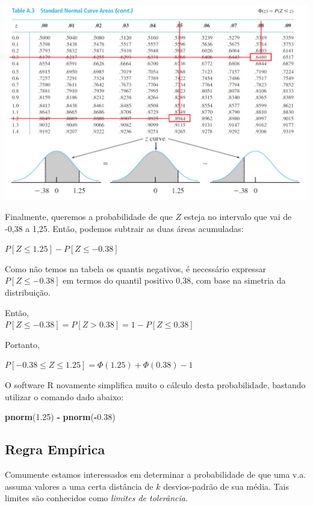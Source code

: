 \documentclass[
]{book}
\newenvironment{Shaded}{\begin{snugshade}}{\end{snugshade}}
\newcommand{\FloatTok}[1]{\textcolor[rgb]{0.00,0.00,0.81}{#1}}
\newcommand{\KeywordTok}[1]{\textcolor[rgb]{0.13,0.29,0.53}{\textbf{#1}}}
\newcommand{\NormalTok}[1]{#1}
\newcommand{\OperatorTok}[1]{\textcolor[rgb]{0.81,0.36,0.00}{\textbf{#1}}}
\newcommand{\StringTok}[1]{\textcolor[rgb]{0.31,0.60,0.02}{#1}}
\theoremstyle{definition}
\theoremstyle{definition}
\theoremstyle{definition}
\theoremstyle{remark}
\begin{document}
\includegraphics[width=1\linewidth]{img/distr-normal-d}

Finalmente, queremos a probabilidade de que \(Z\) esteja no intervalo que vai de -0,38 a 1,25. Então, podemos subtrair as duas áreas acumuladas:

\(P[Z ≤ 1.25] - P[Z ≤ -0.38]\)

Como não temos na tabela os quantis negativos, é necessário expressar \(P[Z ≤ -0.38]\) em termos do quantil positivo 0,38, com base na simetria da distribuição.

Então,\\
\(P[Z ≤ -0.38] = P[Z > 0.38] = 1 - P[Z ≤ 0.38]\)

Portanto,

\(P[-0.38 ≤ Z ≤ 1.25] = \Phi(1.25) + \Phi(0.38) - 1\)

O software R novamente simplifica muito o cálculo desta probabilidade, bastando utilizar o comando dado abaixo:

\begin{Shaded}
\begin{Highlighting}[]
\KeywordTok{pnorm}\NormalTok{(}\FloatTok{1.25}\NormalTok{) }\OperatorTok{-}\StringTok{ }\KeywordTok{pnorm}\NormalTok{(}\OperatorTok{-}\FloatTok{0.38}\NormalTok{)}
\end{Highlighting}
\end{Shaded}

\hypertarget{regra-empuxedrica}{%
\subsection*{Regra Empírica}\label{regra-empuxedrica}}

Comumente estamos interessados em determinar a probabilidade de que uma
v.a. assuma valores a uma certa distância de \(k\) desvios-padrão de sua média. Tais limites são conhecidos como \emph{limites de tolerância}.
\end{document}
